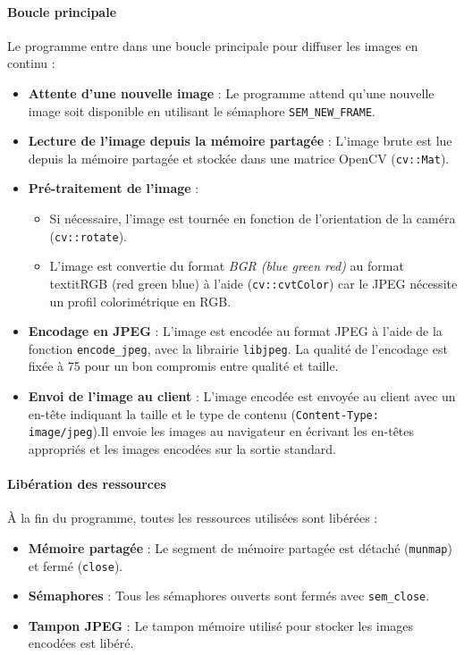 \documentclass[a4paper, 11pt, french]{article}
\begin{document}
\paragraph{Boucle principale}
Le programme entre dans une boucle principale pour diffuser les images en continu :
\begin{itemize}
    \item \textbf{Attente d'une nouvelle image} : Le programme attend qu'une nouvelle image soit disponible en utilisant le sémaphore \texttt{SEM\_NEW\_FRAME}. 
    \item \textbf{Lecture de l'image depuis la mémoire partagée} : L'image brute est lue depuis la mémoire partagée et stockée dans une matrice OpenCV (\texttt{cv::Mat}).
    \item \textbf{Pré-traitement de l'image} :
    \begin{itemize}
        \item Si nécessaire, l'image est tournée en fonction de l'orientation de la caméra (\texttt{cv::rotate}).
        \item L'image est convertie du format  \textit{BGR (blue green red)} au format textit{RGB (red green blue)} à l'aide (\texttt{cv::cvtColor}) car le JPEG nécessite un profil colorimétrique en RGB.
    \end{itemize}
    \item \textbf{Encodage en JPEG} :  L'image est encodée au format JPEG à l'aide de la fonction \texttt{encode\_jpeg}, avec la librairie \texttt{libjpeg}. La qualité de l'encodage est fixée à 75 pour un bon compromis entre qualité et taille.
    \item \textbf{Envoi de l'image au client} :  L'image encodée est envoyée au client avec un en-tête indiquant la taille et le type de contenu (\texttt{Content-Type: image/jpeg}).Il envoie les images au navigateur en écrivant les en-têtes appropriés et les images encodées sur la sortie standard. 
\end{itemize}


\paragraph{Libération des ressources}
À la fin du programme, toutes les ressources utilisées sont libérées :
\begin{itemize}
    \item \textbf{Mémoire partagée} : Le segment de mémoire partagée est détaché (\texttt{munmap}) et fermé (\texttt{close}).
    \item \textbf{Sémaphores} : Tous les sémaphores ouverts sont fermés avec \texttt{sem\_close}.
    \item \textbf{Tampon JPEG} : Le tampon mémoire utilisé pour stocker les images encodées est libéré.
\end{itemize}
\end{document}

